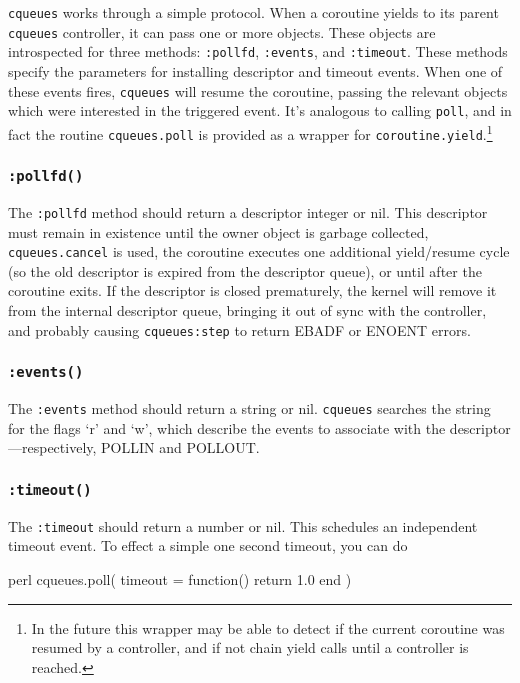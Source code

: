 \documentclass[11pt, oneside]{memoir}
\newcommand*{\cqueues}[0]{\texttt{cqueues}\xspace}
\newcommand*{\syscall}[1]{\texttt{#1}\xspace}
\newcommand*{\routine}[1]{\texttt{#1}\xspace}
\newcommand*{\method}[1]{\texttt{#1}\xspace}
\begin{document}
\cqueues works through a simple protocol. When a coroutine yields to its parent \cqueues controller, it can pass one or more objects. These objects are introspected for three methods: \method{:pollfd}, \method{:events}, and \method{:timeout}. These methods specify the parameters for installing descriptor and timeout events. When one of these events fires, \cqueues will resume the coroutine, passing the relevant objects which were interested in the triggered event. It's analogous to calling \syscall{poll}, and in fact the routine \routine{cqueues.poll} is provided as a wrapper for \routine{coroutine.yield}.\footnote{In the future this wrapper may be able to detect if the current coroutine was resumed by a controller, and if not chain yield calls until a controller is reached.}

\subsubsection[\method{object:pollfd}]{\method{:pollfd()}} The \method{:pollfd} method should return a descriptor integer or nil. This descriptor must remain in existence until the owner object is garbage collected, \routine{cqueues.cancel} is used, the coroutine executes one additional yield/resume cycle (so the old descriptor is expired from the descriptor queue), or until after the coroutine exits. If the descriptor is closed prematurely, the kernel will remove it from the internal descriptor queue, bringing it out of sync with the controller, and probably causing \method{cqueues:step} to return EBADF or ENOENT errors.

\subsubsection[\method{object:events}]{\method{:events()}} The \method{:events} method should return a string or nil. \cqueues searches the string for the flags `r' and `w', which describe the events to associate with the descriptor---respectively, POLLIN and POLLOUT.

\subsubsection[\method{object:timeout}]{\method{:timeout()}} The \method{:timeout} should return a number or nil. This schedules an independent timeout event. To effect a simple one second timeout, you can do

\begin{code}{perl}
        cqueues.poll({ timeout = function() return 1.0 end })
\end{code}
\end{document}
